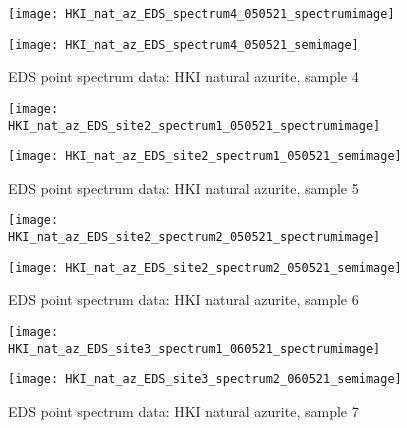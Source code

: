 \begin{figure}[H]
\centering
\begin{minipage}{.45\textwidth}
  \centering
  \texttt{[image: HKI\_nat\_az\_EDS\_spectrum4\_050521\_spectrumimage]}
\end{minipage}
\begin{minipage}{.45\textwidth}
  \centering
  \texttt{[image: HKI\_nat\_az\_EDS\_spectrum4\_050521\_semimage]}
\end{minipage}
\caption[EDS point spectrum data: HKI natural azurite, sample 4]{EDS point spectrum data: HKI natural azurite, sample 4}
\label{fig:hki_point_eds_4}
\end{figure}

\begin{figure}[H]
\centering
\begin{minipage}{.45\textwidth}
  \centering
  \texttt{[image: HKI\_nat\_az\_EDS\_site2\_spectrum1\_050521\_spectrumimage]}
\end{minipage}
\begin{minipage}{.45\textwidth}
  \centering
  \texttt{[image: HKI\_nat\_az\_EDS\_site2\_spectrum1\_050521\_semimage]}
\end{minipage}
\caption[EDS point spectrum data: HKI natural azurite, sample 5]{EDS point spectrum data: HKI natural azurite, sample 5}
\label{fig:hki_point_eds_5}
\end{figure}

\begin{figure}[H]
\centering
\begin{minipage}{.45\textwidth}
  \centering
  \texttt{[image: HKI\_nat\_az\_EDS\_site2\_spectrum2\_050521\_spectrumimage]}
\end{minipage}
\begin{minipage}{.45\textwidth}
  \centering
  \texttt{[image: HKI\_nat\_az\_EDS\_site2\_spectrum2\_050521\_semimage]}
\end{minipage}
\caption[EDS point spectrum data: HKI natural azurite, sample 6]{EDS point spectrum data: HKI natural azurite, sample 6}
\label{fig:hki_point_eds_6}
\end{figure}

\begin{figure}[H]
\centering
\begin{minipage}{.45\textwidth}
  \centering
  \texttt{[image: HKI\_nat\_az\_EDS\_site3\_spectrum1\_060521\_spectrumimage]}
\end{minipage}
\begin{minipage}{.45\textwidth}
  \centering
  \texttt{[image: HKI\_nat\_az\_EDS\_site3\_spectrum2\_060521\_semimage]}
\end{minipage}
\caption[EDS point spectrum data: HKI natural azurite, sample 7]{EDS point spectrum data: HKI natural azurite, sample 7}
\label{fig:hki_point_eds_7}
\end{figure}

